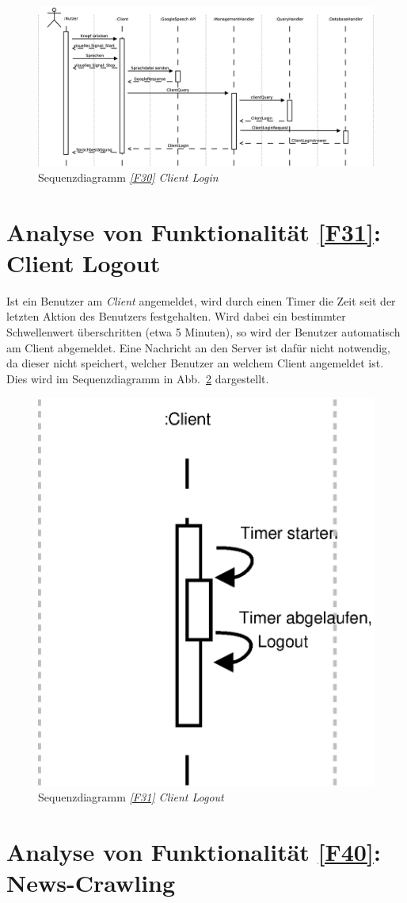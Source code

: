\begin{figure}[h]
\centering
\includegraphics[width=1\textheight, angle=90]{Systementwurf/02_produktfunktionsanalyse/f300}
\caption{Sequenzdiagramm \textit{\ref{F30} Client Login}
\label{sd30}}
\end{figure}

\FloatBarrier

\section{Analyse von Funktionalität \ref{F31}: Client Logout}

Ist ein Benutzer am \textit{Client} angemeldet, wird durch einen Timer die Zeit
seit der letzten Aktion des Benutzers festgehalten. Wird dabei ein bestimmter
Schwellenwert überschritten (etwa 5 Minuten), so wird der Benutzer automatisch
am Client abgemeldet. Eine Nachricht an den Server ist dafür nicht notwendig, da
dieser nicht speichert, welcher Benutzer an welchem Client angemeldet ist.
Dies wird im Sequenzdiagramm in Abb.~\ref{sd31} dargestellt.

\begin{figure}[h]
\centering
\includegraphics[width=.3\textwidth]{Systementwurf/02_produktfunktionsanalyse/f310}
\caption{Sequenzdiagramm \textit{\ref{F31} Client Logout}
\label{sd31}}
\end{figure}


\section{Analyse von Funktionalität \ref{F40}: News-Crawling}

